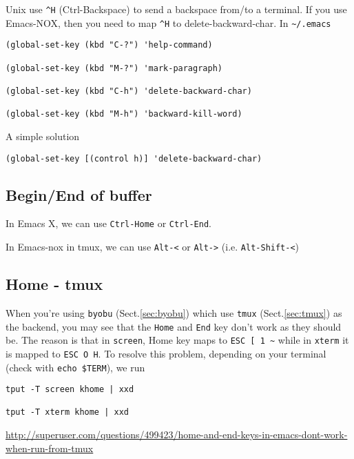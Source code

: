 Unix use \verb!^H! (Ctrl-Backspace) to send a backspace from/to a terminal. If
you use Emacs-NOX, then you need to map \verb!^H! to delete-backward-char. In
\verb!~/.emacs!
\begin{verbatim}
(global-set-key (kbd "C-?") 'help-command)

(global-set-key (kbd "M-?") 'mark-paragraph)

(global-set-key (kbd "C-h") 'delete-backward-char)

(global-set-key (kbd "M-h") 'backward-kill-word)
\end{verbatim}

A simple solution
\begin{verbatim}
(global-set-key [(control h)] 'delete-backward-char)
\end{verbatim}

\subsection{Begin/End of buffer}

In Emacs X, we can use \verb!Ctrl-Home! or \verb!Ctrl-End!. 

In Emacs-nox in tmux, we can use \verb!Alt-<! or \verb!Alt->!
(i.e. \verb!Alt-Shift-<!)

\subsection{Home - tmux}


When you're using \verb!byobu! (Sect.\ref{sec:byobu}) which use \verb!tmux!
(Sect.\ref{sec:tmux}) as the backend, you may see that the \verb!Home! and
\verb!End! key don't work as they should be. The reason is that in \verb!screen!, Home key maps to \verb!ESC [ 1 ~! while in
\verb!xterm! it is mapped to \verb!ESC O H!. To resolve this problem,
depending on your terminal (check with \verb!echo $TERM!), we run

\begin{verbatim}
tput -T screen khome | xxd

tput -T xterm khome | xxd
\end{verbatim}

\url{http://superuser.com/questions/499423/home-and-end-keys-in-emacs-dont-work-when-run-from-tmux}


